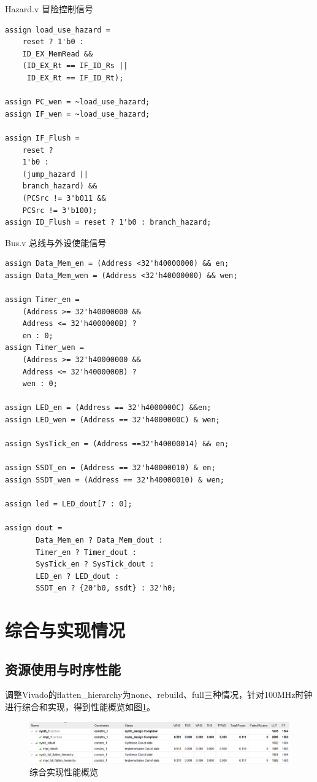 \documentclass[a4paper]{article}
\begin{document}
Hazard.v 冒险控制信号

\begin{verbatim}
assign load_use_hazard =
    reset ? 1'b0 :
    ID_EX_MemRead &&
    (ID_EX_Rt == IF_ID_Rs ||
     ID_EX_Rt == IF_ID_Rt);

assign PC_wen = ~load_use_hazard;
assign IF_wen = ~load_use_hazard;

assign IF_Flush = 
    reset ? 
    1'b0 : 
    (jump_hazard || 
    branch_hazard) && 
    (PCSrc != 3'b011 && 
    PCSrc != 3'b100);
assign ID_Flush = reset ? 1'b0 : branch_hazard;
\end{verbatim}

Bus.v 总线与外设使能信号

\begin{verbatim}
assign Data_Mem_en = (Address <32'h40000000) && en;
assign Data_Mem_wen = (Address <32'h40000000) && wen;

assign Timer_en = 
    (Address >= 32'h40000000 && 
    Address <= 32'h4000000B) ? 
    en : 0;
assign Timer_wen = 
    (Address >= 32'h40000000 &&
    Address <= 32'h4000000B) ? 
    wen : 0;

assign LED_en = (Address == 32'h4000000C) &&en;
assign LED_wen = (Address == 32'h4000000C) & wen;

assign SysTick_en = (Address ==32'h40000014) && en;

assign SSDT_en = (Address == 32'h40000010) & en;
assign SSDT_wen = (Address == 32'h40000010) & wen;

assign led = LED_dout[7 : 0];

assign dout =
       Data_Mem_en ? Data_Mem_dout :
       Timer_en ? Timer_dout :
       SysTick_en ? SysTick_dout :
       LED_en ? LED_dout :
       SSDT_en ? {20'b0, ssdt} : 32'h0;
\end{verbatim}

\section{综合与实现情况}

\subsection{资源使用与时序性能}

调整Vivado的flatten\_hierarchy为none、rebuild、full三种情况，针对100MHz时钟进行综合和实现，得到性能概览如图\ref{fig:综合实现性能概览}。

\begin{figure}[htb]
    \centering
    \includegraphics[width=.9\textwidth]{../assets/综合实现情况.png}
    \caption{综合实现性能概览}
    \label{fig:综合实现性能概览}
\end{figure}
\end{document}
